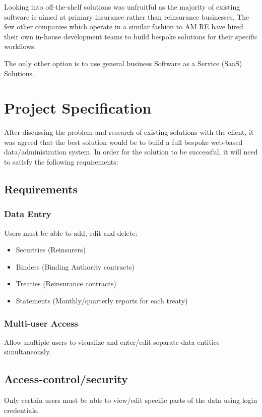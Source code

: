 \documentclass[12pt]{article}
\begin{document}
Looking into off-the-shelf solutions was unfruitful as the majority of existing software is aimed at primary insurance rather than reinsurance businesses. The few other companies which operate in a similar fashion to AM RE have hired their own in-house development teams to build bespoke solutions for their specific workflows.

The only other option is to use general business Software as a Service (SaaS) Solutions.

\section{Project Specification}
After discussing the problem and research of existing solutions with the client, it was agreed that the best solution would be to build a full bespoke web-based data/administration system. In order for the solution to be successful, it will need to satisfy the following requirements:

\subsection{Requirements}

\subsubsection*{Data Entry}
Users must be able to add, edit and delete:
\begin{itemize}
    \item Securities (Reinsurers)
    \item Binders (Binding Authority contracts)
    \item Treaties (Reinsurance contracts)
    \item Statements (Monthly/quarterly reports for each treaty)
\end{itemize}

\subsubsection*{Multi-user Access}
Allow multiple users to visualize and enter/edit separate data entities simultaneously.
\subsection*{Access-control/security}
Only certain users must be able to view/edit specific parts of the data using login credentials.
\end{document}
